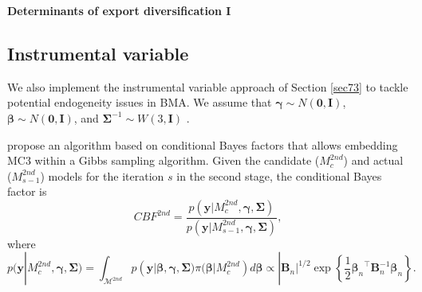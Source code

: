 \textbf{Determinants of export diversification I}





\subsection{Instrumental variable }\label{sec10_21}

We also implement the instrumental variable approach of Section \ref{sec73} to tackle potential endogeneity issues in BMA. We assume that $\bm{\gamma}\sim {N}(\bm{0},\bm{I})$, $\bm{\beta}\sim {N}(\bm{0},\bm{I})$, and $\bm{\Sigma}^{-1} \sim {W}(3,\bm{I})$ \cite{Karl2012}.

\cite{Lenkoski2013} propose an algorithm based on conditional Bayes factors \cite{Dickey1978} that allows embedding MC3 within a Gibbs sampling algorithm. Given the candidate ($M_{c}^{2nd}$) and actual ($M_{s-1}^{2nd}$) models for the iteration $s$ in the second stage, the conditional Bayes factor is 
\begin{equation*}
	CBF^{2nd}=\frac{p(\bm{y}|M_{c}^{2nd},\bm{\gamma},\bm{\Sigma})}{p(\bm{y}|M_{s-1}^{2nd},\bm{\gamma},\bm{\Sigma})},
\end{equation*}
where 
\begin{equation*}
	p(\bm{y}|M_{c}^{2nd},\bm{\gamma},\bm{\Sigma})=\int_{\mathcal{M}^{2nd}}p(\bm{y}|\bm{\beta},\bm{\gamma},\bm{\Sigma})\pi(\bm{\beta}|M_{c}^{2nd})d\bm{\beta}\propto |\bm{B}_n|^{1/2} \exp\left\{\frac{1}{2}{\bm{\beta}_n}^{\top}\bm{B}_n^{-1}\bm{\beta}_n\right\}
	.
\end{equation*}

